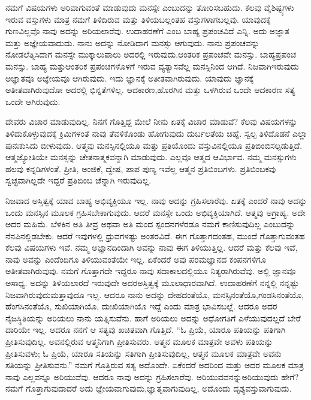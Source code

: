 ನಮಗೆ ವಿಷಯಗಳು ಅರಿವಾಗುವಂತೆ ಮಾಡುವುದು ಮನಸ್ಸೇ ಎಂಬುದನ್ನು ತೋರಿಸಬಹುದು. ಕೆಲವು ವೈಶಿಷ್ಟ್ಯಗಳು ಇರುವ ವಸ್ತುಗಳು ಮಾತ್ರ ನಮಗೆ ತಿಳಿದಿರುವ ಮತ್ತು ತಿಳಿಯಬಲ್ಲಂತಹ ವಸ್ತುಗಳಾಗಬಲ್ಲವು. ಯಾವುದಕ್ಕೆ ಗುಣವಿಲ್ಲವೊ ನಾವು ಅದನ್ನು ಅರಿಯಲಾರೆವು. ಉದಾಹರಣೆಗೆ  ಎಂಬ ಬಾಹ್ಯ ಪ್ರಪಂಚವಿದೆ ಎನ್ನಿ. ಅದು ಅಜ್ಞಾತ ಮತ್ತು ಅಜ್ಞೇಯವಾದುದು. ನಾನು ಅದನ್ನು ನೋಡಿದಾಗ  ಮನಸ್ಸು ಆಗುವುದು. ನಾನು ಪ್ರಪಂಚವನ್ನು ನೋಡಲೆತ್ನಿಸಿದಾಗ ಮನಸ್ಸೇ ಮುಕ್ಕಾಲುಪಾಲು ಅದರಲ್ಲಿ ಇರುವುದು.\break ಆಂತರಿಕ ಪ್ರಪಂಚವೇ  ಮನಸ್ಸು. ಬಾಹ್ಯಪ್ರಪಂಚ  ಮನಸ್ಸು. ಬಾಹ್ಯ ಮತ್ತು\break ಆಂತರಿಕ ಪ್ರಪಂಚಗಳೊಳಗೆ ಇರುವ ವ್ಯತ್ಯಾಸವೆಲ್ಲ ಮನಸ್ಸಿನಿಂದ ಆಗಿದೆ. ನಿಜವಾಗಿ\break ಇರುವುದು ಅಜ್ಞಾತವೂ ಅಜ್ಞೇಯವೂ ಆಗಿರುವುದು. ಇದು ಜ್ಞಾನಕ್ಕೆ ಅತೀತವಾಗಿರುವುದು. ಯಾವುದು ಜ್ಞಾನಕ್ಕೆ ಅತೀತವಾಗಿರುವುದೋ ಅದರಲ್ಲಿ ಭಿನ್ನತೆಗಳಿಲ್ಲ. ಆದಕಾರಣ,\break ಹೊರಗಿನ  ಮತ್ತು  ಒಳಗಿರುವ ಒಂದೇ ಆದಕಾರಣ ಸತ್ಯ ಒಂದೇ ಆಗಿರುವುದು.

ದೇವರು ವಿಚಾರ ಮಾಡುವುದಿಲ್ಲ. ನಿನಗೆ ಗೊತ್ತಿದ್ದ ಮೇಲೆ ನೀನು ಏತಕ್ಕೆ ವಿಚಾರ ಮಾಡುವೆ? ಕೆಲವು ವಿಷಯಗಳನ್ನು ತಿಳಿದುಕೊಳ್ಳುವುದಕ್ಕೆ ಕ್ರಿಮಿಗಳಂತೆ ನಾವು ತೆವಳಿಕೊಂಡು ಹೋಗುವುದು ದುರ್ಬಲತೆಯ ಚಿಹ್ನೆ. ಸ್ವಲ್ಪ ತಿಳಿದೊಡನೆ ಎಲ್ಲಾ ಪುನಃ\break ಕುಸಿದು ಬೀಳುವುದು. ಆತ್ಮವು ಮನಸ್ಸಿನಲ್ಲಿಯೂ ಮತ್ತು ಪ್ರತಿಯೊಂದು ವಸ್ತುವಿನಲ್ಲಿಯೂ ಪ್ರತಿಬಿಂಬಿಸಲ್ಪಡುತ್ತಿದೆ. ಆತ್ಮಜ್ಯೋತಿಯೇ ಮನಸ್ಸನ್ನು ಚೇತನಾತ್ಮಕವನ್ನಾಗಿ ಮಾಡುವುದು. ಎಲ್ಲವೂ ಆತ್ಮದ ಆವಿರ್ಭಾವ. ನಮ್ಮ ಮನಸ್ಸುಗಳು ಹಲವು ಕನ್ನಡಿಗಳಂತೆ. ಪ್ರೀತಿ, ಅಂಜಿಕೆ, ದ್ವೇಷ, ಪಾಪ ಪುಣ್ಯ ಇವೆಲ್ಲ ಆತ್ಮನ ಪ್ರತಿಬಿಂಬಗಳು. ಪ್ರತಿಬಿಂಬಕವು ಸ್ವಚ್ಛವಾಗಿಲ್ಲದೇ ಇದ್ದರೆ ಪ್ರತಿಬಿಂಬ ಚೆನ್ನಾಗಿ ಇರುವುದಿಲ್ಲ.

\eject

ನಿಜವಾದ ಅಸ್ತಿತ್ವಕ್ಕೆ ಯಾವ ಬಾಹ್ಯ ಅಭಿವ್ಯಕ್ತಿಯೂ ಇಲ್ಲ. ನಾವು ಅದನ್ನು ಗ್ರಹಿಸಲಾರೆವು. ಏತಕ್ಕೆ ಎಂದರೆ ನಾವು ಅದನ್ನು ಒಂದು ಮನಸ್ಸಿನ ಮೂಲಕ ಗ್ರಹಿಸಬೇಕಾಗುವುದು. ಆದರೆ ಮನಸ್ಸೇ ಒಂದು ಅಭಿವ್ಯಕ್ತಿಯಾಗಿದೆ. ಆತ್ಮವು ಅಗ್ರಾಹ್ಯ. ಅದೇ ಅದರ ಮಹಿಮೆ. ಬೆಳಕಿನ ಅತಿ ತೀವ್ರ ಅಥವಾ ಅತಿ ಮಂದ ಸ್ಪಂದನಗಳೆರಡೂ ನಮಗೆ ಕಾಣಿಸುವುದಿಲ್ಲ ಎಂಬುದನ್ನು ನೆನಪಿನಲ್ಲಿಡಬೇಕು. ಆದರೆ ಇವುಗಳಲ್ಲಿ ಧ್ರುವಗಳಷ್ಟು ಅಂತರವಿದೆ. ಈಗ ಗೊತ್ತಾಗದಂತಹ, ಮುಂದೆ ಗೊತ್ತಾಗುವಂತಹ ಕೆಲವು ವಿಷಯಗಳು ಇವೆ. ನಮ್ಮ ಅಜ್ಞಾನದಿಂದಾಗಿ ಅವನ್ನು ನಾವು ಈಗ ತಿಳಿಯುತ್ತಿಲ್ಲ. ಆದರೆ ಮತ್ತು ಕೆಲವು ಇವೆ, ನಾವು ಅವನ್ನು ಎಂದೆಂದಿಗೂ ತಿಳಿಯುವಂತೆಯೇ ಇಲ್ಲ. ಏಕೆಂದರೆ ಅವು ಪರಮಜ್ಞಾನದ ಕಂಪನಗಳಿಗೂ ಅತೀತವಾಗಿರುವುವು. ನಮಗೆ ಗೊತ್ತಾಗದೇ ಇದ್ದರೂ ನಾವು ಸದಾಕಾಲದಲ್ಲಿಯೂ ನಿತ್ಯರಾಗಿರುವೆವು. ಅಲ್ಲಿ ಜ್ಞಾನವೂ ಅಸಾಧ್ಯ. ಅದನ್ನು ತಿಳಿಯಲಾರದೆ ಇರುವುದೇ ಅದರ\break ಅಸ್ತಿತ್ವಕ್ಕೆ ಮೂಲಾಧಾರವಾಗಿದೆ. ಉದಾಹರಣೆಗೆ ನನ್ನಲ್ಲಿ ನನ್ನಷ್ಟು ನಿಜವಾಗಿರುವುದು\break ಮತ್ತಾವುದೂ ಇಲ್ಲ. ಆದರೂ ನಾನು ಅದನ್ನು ದೇಹದಂತೆಯೊ, ಮನಸ್ಸಿನಂತೆಯೊ,\break ಗಂಡಸಿನಂತೆಯೊ, ಹೆಂಗಸಿನಂತೆಯೊ, ಸುಖಿಯಾಗಿಯೊ, ದುಃಖಿಯಾಗಿಯೊ ಇದ್ದೆ ಎಂದು ಮಾತ್ರ ಭಾವಿಸಬಲ್ಲೆ. ಆದರೂ ಅದರ ನೈಜಸ್ಥಿತಿಯನ್ನು ಅರಿಯಲು ನಾನು ಯತ್ನಿಸುವೆನು. ಹಾಗೆ ಅರಿಯಲು ಅದನ್ನು ಅಧೋಗತಿಗೆ ಎಳೆಯುವುದಲ್ಲದೆ ಬೇರೆ ದಾರಿಯೇ ಇಲ್ಲ. ಆದರೂ ನನಗೆ ಆ ಸತ್ಯವು ಖಚಿತವಾಗಿ ಗೊತ್ತಿದೆ. “ಓ ಪ್ರಿಯೆ, ಯಾರೂ ಪತಿಯನ್ನು ಪತಿಗಾಗಿ ಪ್ರೀತಿಸುವುದಿಲ್ಲ. ಅವನಲ್ಲಿರುವ ಆತ್ಮನಿಗಾಗಿ ಪ್ರೀತಿಸುವರು. ಆತ್ಮನ ಮೂಲಕ ಮಾತ್ರವೇ ಅವಳು ಪತಿಯನ್ನು ಪ್ರೀತಿಸುವಳು; ಓ ಪ್ರಿಯೆ, ಯಾರೂ ಸತಿಯನ್ನು ಸತಿಗಾಗಿ ಪ್ರೀತಿಸುವುದಿಲ್ಲ, ಆತ್ಮನ ಮೂಲಕ ಮಾತ್ರವೇ ಅವನು ಸತಿಯನ್ನು ಪ್ರೀತಿಸುವನು.” ನಮಗೆ ಗೊತ್ತಿರುವ ಸತ್ಯ ಅದೊಂದೇ. ಏಕೆಂದರೆ ಅದರಿಂದ ಮತ್ತು ಅದರ ಮೂಲಕ ಮಾತ್ರ ನಾವು ಎಲ್ಲವನ್ನೂ ಅರಿಯುವೆವು. ಆದರೂ ನಾವು ಅದನ್ನು ಗ್ರಹಿಸಲಾರೆವು. ಅರಿಯುವವನನ್ನು\break ಅರಿಯುವುದು ಹೇಗೆ? ನಮಗೆ ಗೊತ್ತಾಗುವುದಾದರೆ ಅದು ಜ್ಞೇಯವಾಗುವುದು,\break ಜ್ಞಾತೃವಾಗುವುದಿಲ್ಲ, ಅದೊಂದು ದೃಶ್ಯವಸ್ತುವಾಗುವುದು.

